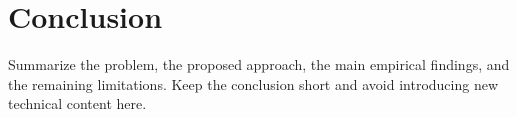 \section{Conclusion}

Summarize the problem, the proposed approach, the main empirical findings, and the remaining limitations. Keep the conclusion short and avoid introducing new technical content here.
